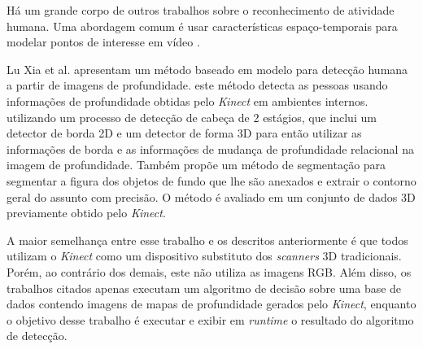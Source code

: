 Há um grande corpo de outros trabalhos sobre o reconhecimento de atividade humana. Uma abordagem comum é usar características espaço-temporais para modelar pontos de interesse em vídeo \cite{dollar2005behavior,laptev2003space}.



Lu Xia et al. \cite{xia2011human} apresentam um método baseado em modelo para detecção humana a partir de imagens de profundidade. este método detecta as pessoas usando informações de profundidade obtidas pelo \textit{Kinect} em ambientes internos. utilizando um processo de detecção de cabeça de 2 estágios, que inclui um detector de borda 2D e um detector de forma 3D para então utilizar as informações de borda e as informações de mudança de profundidade relacional na imagem de profundidade. Também propõe um método de segmentação para segmentar a figura dos objetos de fundo que lhe são anexados e extrair o contorno geral do assunto com precisão. O método é avaliado em um conjunto de dados 3D previamente obtido pelo \textit{Kinect}.



A maior semelhança entre esse trabalho e os descritos anteriormente é que todos utilizam o \textit{Kinect} como um dispositivo substituto dos \textit{scanners} 3D tradicionais. Porém, ao contrário dos demais, este não utiliza as imagens RGB. Além disso, os trabalhos citados apenas executam um algoritmo de decisão sobre uma base de dados contendo imagens de mapas de profundidade gerados pelo  \textit{Kinect}, enquanto o objetivo desse trabalho é executar e exibir em  \textit{runtime} o resultado do algoritmo de detecção.
